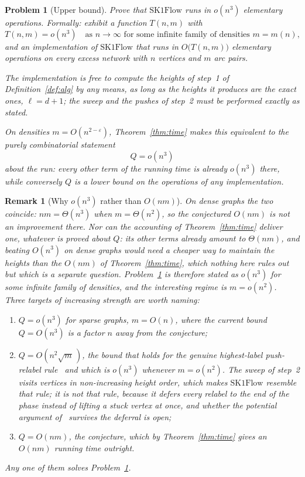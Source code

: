 \documentclass[10pt]{article}
\newtheorem{problem}{Problem}
\newtheorem{remark}[theorem]{Remark}
\newcommand{\SKF}{\text{SK1Flow}}
\begin{document}
\begin{problem}[Upper bound]\label{prob:upper}
Prove that $\SKF$ runs in $o(n^{3})$ elementary operations. Formally: exhibit a
function $T(n,m)$ with
\[
  T(n,m)=o(n^{3})\quad\text{as }n\to\infty\text{ for some infinite family of
  densities }m=m(n),
\]
and an implementation of $\SKF$ that runs in $O\bigl(T(n,m)\bigr)$ elementary
operations on every excess network with $n$ vertices and $m$ arc pairs.

The implementation is free to compute the heights of step~1 of
Definition~\ref{def:alg} by any means, as long as the heights it produces are
the exact ones, $\ell=d+1$; the sweep and the pushes of step~2 must be
performed exactly as stated.

On densities $m=O(n^{2-\varepsilon})$, Theorem~\ref{thm:time} makes this
equivalent to the purely combinatorial statement
\[
  Q=o(n^{3})
\]
about the run: every other term of the running time is already $o(n^{3})$
there, while conversely $Q$ is a lower bound on the operations of any
implementation.
\end{problem}

\begin{remark}[Why $o(n^{3})$ rather than $O(nm)$]\label{rem:density}
On dense graphs the two coincide: $nm=\Theta(n^{3})$ when $m=\Theta(n^{2})$, so
the conjectured $O(nm)$ is \emph{not} an improvement there. Nor can the
accounting of Theorem~\ref{thm:time} deliver one, whatever is proved about $Q$:
its other terms already amount to $\Theta(nm)$, and beating $O(n^{3})$ on dense
graphs would need a cheaper way to maintain the heights than the $O(nm)$ of
Theorem~\ref{thm:time}, which nothing here rules out but which is a separate
question. Problem~\ref{prob:upper} is therefore stated as $o(n^{3})$
for \emph{some} infinite family of densities, and the interesting regime is
$m=o(n^{2})$. Three targets of increasing strength are worth naming:
\begin{enumerate}
  \item $Q=o(n^{3})$ for sparse graphs, $m=O(n)$, where the current bound
  $Q=O(n^{3})$ is a factor $n$ away from the conjecture;
  \item $Q=O(n^{2}\sqrt m\,)$, the bound that holds for the genuine
  highest-label push-relabel rule~\cite{CheriyanMaheshwari89} and which is
  $o(n^{3})$ whenever $m=o(n^{2})$. The sweep of step~2 visits vertices in
  non-increasing height order, which makes $\SKF$ resemble that rule; it is not
  that rule, because it defers every relabel to the end of the phase instead of
  lifting a stuck vertex at once, and whether the potential argument
  of~\cite{CheriyanMaheshwari89,CheriyanMehlhorn99} survives the deferral is
  open;
  \item $Q=O(nm)$, the conjecture, which by Theorem~\ref{thm:time} gives
  an $O(nm)$ running time outright.
\end{enumerate}
Any one of them solves Problem~\ref{prob:upper}.
\end{remark}
\end{document}
